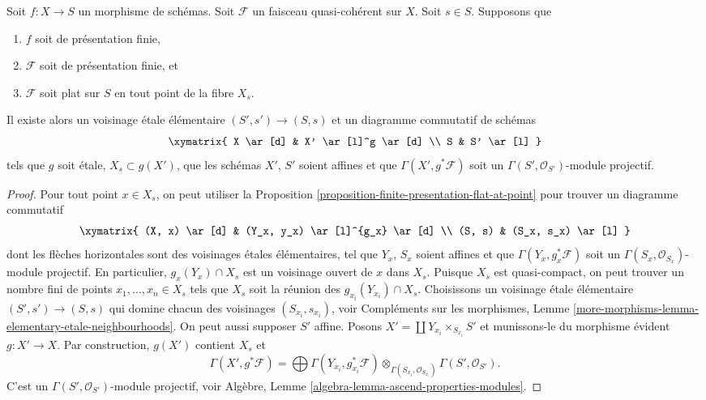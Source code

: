 \begin{lemma}
\label{lemma-finite-presentation-flat-along-fibre}
Soit $f : X \to S$ un morphisme de schémas.
Soit $\mathcal{F}$ un faisceau quasi-cohérent sur $X$.
Soit $s \in S$.
Supposons que
\begin{enumerate}
\item $f$ soit de présentation finie,
\item $\mathcal{F}$ soit de présentation finie, et
\item $\mathcal{F}$ soit plat sur $S$ en tout point de la fibre $X_s$.
\end{enumerate}
Il existe alors un voisinage \'etale élémentaire
$(S', s') \to (S, s)$ et un diagramme commutatif de schémas
$$
\xymatrix{
X \ar[d] & X' \ar[l]^g \ar[d] \\
S & S' \ar[l]
}
$$
tels que $g$ soit \'etale, $X_s \subset g(X')$, que les schémas
$X'$, $S'$ soient affines et que
$\Gamma(X', g^*\mathcal{F})$ soit un
$\Gamma(S', \mathcal{O}_{S'})$-module projectif.
\end{lemma}

\begin{proof}
Pour tout point $x \in X_s$, on peut utiliser la
Proposition \ref{proposition-finite-presentation-flat-at-point}
pour trouver un diagramme commutatif
$$
\xymatrix{
(X, x) \ar[d] & (Y_x, y_x) \ar[l]^{g_x} \ar[d] \\
(S, s) & (S_x, s_x) \ar[l]
}
$$
dont les flèches horizontales sont des voisinages \'etales élémentaires,
tel que $Y_x$, $S_x$ soient affines et que
$\Gamma(Y_x, g_x^*\mathcal{F})$ soit un
$\Gamma(S_x, \mathcal{O}_{S_x})$-module projectif. En particulier,
$g_x(Y_x) \cap X_s$ est un voisinage ouvert de $x$ dans $X_s$.
Puisque $X_s$ est quasi-compact, on peut trouver un nombre fini de points
$x_1, \ldots, x_n \in X_s$ tels que $X_s$ soit la réunion
des $g_{x_i}(Y_{x_i}) \cap X_s$. Choisissons un voisinage \'etale élémentaire
$(S' , s') \to (S, s)$ qui domine chacun des voisinages
$(S_{x_i}, s_{x_i})$, voir
Compléments sur les morphismes,
Lemme \ref{more-morphisms-lemma-elementary-etale-neighbourhoods}.
On peut aussi supposer $S'$ affine.
Posons $X' = \coprod Y_{x_i} \times_{S_{x_i}} S'$ et munissons-le du
morphisme évident $g : X' \to X$.
Par construction, $g(X')$ contient $X_s$ et
$$
\Gamma(X', g^*\mathcal{F})
=
\bigoplus \Gamma(Y_{x_i}, g_{x_i}^*\mathcal{F})
\otimes_{\Gamma(S_{x_i}, \mathcal{O}_{S_{x_i}})}
\Gamma(S', \mathcal{O}_{S'}).
$$
C'est un $\Gamma(S', \mathcal{O}_{S'})$-module projectif, voir
Algèbre, Lemme \ref{algebra-lemma-ascend-properties-modules}.
\end{proof}

